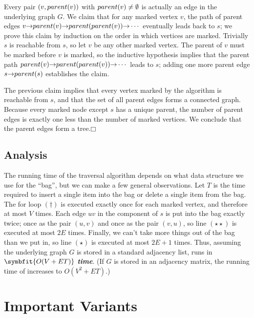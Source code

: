 Every pair $(v, parent(v))$ with $parent(v) \neq \emptyset$ is actually an edge in the underlying graph $G$.
We claim that for any marked vertex $v$, the path of parent edges $v\mathord{\rightarrow}parent(v)\mathord{\rightarrow}parent(parent(v))\mathord{\rightarrow}\cdots$ eventually leads back to $s$; we prove this claim by induction on the order in which vertices are marked.
Trivially $s$ is reachable from $s$, so let $v$ be any other marked vertex.
The parent of $v$ must be marked before $v$ is marked, so the inductive hypothesis implies that the parent path $parent(v)\mathord{\rightarrow}parent(parent(v))\mathord{\rightarrow}\cdots$ leads to $s$; adding one more parent edge $s\mathord{\rightarrow}parent(s)$ establishes the claim.

The previous claim implies that every vertex marked by the algorithm is reachable from $s$, and that the set of all parent edges forms a connected graph.
Because every marked node except $s$ has a unique parent, the number of parent edges is exactly one less than the number of marked vertices.
We conclude that the parent edges form a tree.\hfill$\mdlgwhtsquare$

\subsection{Analysis}

The running time of the traversal algorithm depends on what data structure we use for the “bag”, but we can make a few general observations.
Let $T$ is the time required to insert a single item into the bag or delete a single item from the bag.
The for loop $(\dagger)$ is executed exactly once for each marked vertex, and therefore at most $V$ times.
Each edge $uv$ in the component of $s$ is put into the bag exactly twice; once as the pair $(u, v)$ and once as the pair $(v, u)$, so line $(\star\star)$ is executed at most $2E$ times.
Finally, we can’t take more things out of the bag than we put in, so line $(\star)$ is executed at most $2E + 1$ times.
Thus, assuming the underlying graph $G$ is stored in a standard adjacency list,  runs in $\symbfit{O(V + ET)}$ \textbf{\textit{time}}.
(If $G$ is stored in an adjacency matrix, the running time of  increases to $O(V^2 + ET)$.)

\section{Important Variants}
\label{sec:5.6}

